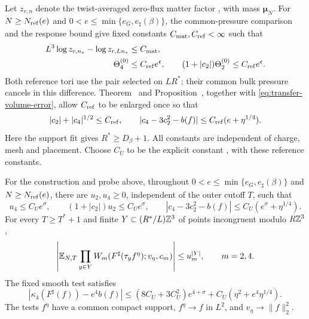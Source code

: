 Let $z_{r,n}$ denote the twist-averaged zero-flux matter factor
, with mass $\boldsymbol\mu_N$.
For $N\ge N_{\rm ref}(e)$ and
$0<e\le\min\{e_G,e_\sharp(\beta)\}$, the common-pressure
comparison  and the response
bound  give fixed constants
$C_{\rm mat},C_{\rm ref}<\infty$ such that
\begin{align}
 L^3\log z_{r,n_*}-\log z_{r,Ln_*}&\le C_{\rm mat},\notag\\
 \Theta_4^{(0)}&\le C_{\rm ref}e^{\mathfrak e},\qquad
 (1+|c_2|)\Theta_2^{(0)}\le C_{\rm ref}e^{\mathfrak e}.
                                      \label{eq:transfer-terminal-input}
\end{align}
Both reference tori use the pair selected on $LR^*$;
their common bulk pressure cancels in this difference.
Theorem~ and
Proposition~, together with
\eqref{eq:transfer-volume-error}, allow $C_{\rm ref}$ to be
enlarged once so that
\begin{equation}\label{eq:transfer-free-input}
 |c_2|+|c_4|^{1/2}\le C_{\rm ref},\qquad
 |c_4-3c_2^2-b(f)|\le C_{\rm ref}(e+\eta^{1/4}).
\end{equation}
Here the support fit gives $R^*\ge D_\beta+1$.
All constants are independent of charge, mesh and placement.
Choose $C_U$ to be the explicit constant
, with these reference constants.

\begin{proposition}\label{prop:transfer-UV-inputs}
For the construction and probe above, throughout
$0<e\le\min\{e_G,e_\sharp(\beta)\}$ and
$N\ge N_{\rm ref}(e)$, there are $u_2,u_4\ge0$, independent
of the outer cutoff $T$, such that
\begin{equation}\label{eq:transfer-small-Wick}
 u_4\le C_Ue^\sigma,\qquad
 (1+|c_2|)u_2\le C_Ue^\sigma,\qquad
 |c_4-3c_2^2-b(f)|\le C_U(e^\sigma+\eta^{1/4}).
\end{equation}
For every $T\ge T^*+1$ and finite
$Y\subset(R^*/L)\mathbb Z^3$ of points incongruent modulo $R\mathbb Z^3$,
\begin{equation}\label{eq:transfer-translated-Wick}
 \left|\mathbb E_{N,T}\prod_{y\in Y}
 W_m(F^\sharp(\tau_yf^\eta);v_\eta,c_m)\right|
                      \le u_m^{|Y|},\qquad m=2,4.
\end{equation}
The fixed smooth test satisfies
\begin{equation}\label{eq:transfer-smooth-cumulant}
 |\kappa_4(F^\sharp(f))-e^4b(f)|
 \le(8C_U+3C_U^2)e^{4+\sigma}
                   +C_U(\eta^2+e^4\eta^{1/4}).
\end{equation}
The tests $f^\eta$ have a common compact support,
$f^\eta\to f$ in $L^2$, and $v_\eta\to\|f\|_2^2$.
\end{proposition}

